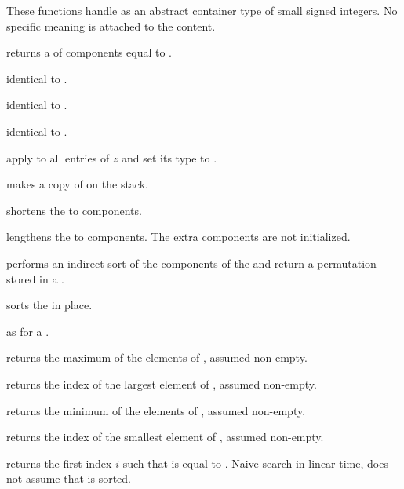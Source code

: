 
These functions handle  as an abstract container type
of small signed integers. No specific meaning is attached to the content.

 returns a 
of  components equal to .

 identical to .

 identical to .

 identical to .

 apply  to all entries
of $z$ and set its type to .

 makes a copy of  on the stack.

 shortens the  
to  components.

 lengthens the 
 to  components. The extra components are not initialized.

 performs an indirect sort of the
components of the   and return a permutation stored in a
.

 sorts the   in place.

 as  for a 
.

 returns the maximum of the elements of
 , assumed non-empty.

 returns the index of the largest
element of  , assumed non-empty.

 returns the minimum of the elements of
 , assumed non-empty.

 returns the index of the smallest
element of  , assumed non-empty.

 returns the first index $i$
such that  is equal to . Naive search in linear time, does
not assume that  is sorted.

